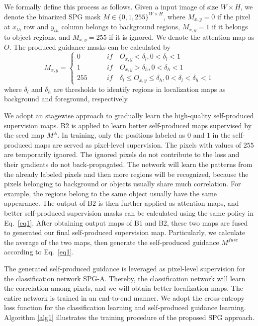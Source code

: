 \documentclass[runningheads]{llncs}
\begin{document}
We formally define this process as follows. Given a input image of size $W \times H$, we denote the binarized SPG mask $M\in\{0,1,255\}^{W\times H}$,
where $M_{x,y} = 0$ if the pixel at $x_{th}$ row and $y_{th}$ column belongs to background regions, $M_{x,y} = 1$ if it belongs to object regions, and $M_{x,y} = 255$ if it is ignored.
We denote the attention map as $O$.
The produced guidance masks can be calculated by
\begin{equation}\label{eq1}
M_{x,y} = \left\{
\begin{aligned}
 0 \qquad   &if \quad O_{x,y} < \delta_l, 0<\delta_l<1 \\
 1 \qquad   &if \quad O_{x,y} > \delta_h, 0<\delta_h<1 \\
 255 \qquad &if \quad \delta_l \leq  O_{x,y}  \leq \delta_h, 0<\delta_l<\delta_h<1
\end{aligned}
\right.
\end{equation}
where $\delta_l$ and $\delta_h$ are thresholds to identify regions in localization maps as background and foreground, respectively.

We adopt an stagewise approach to gradually learn the high-quality self-produced supervision maps.
B2 is applied to learn better self-produced maps supervised by the seed map $M^{A}$.
In training, only the positions labeled as $0$ and $1$ in the self-produced maps are served as pixel-level supervision.
The pixels with values of $255$ are temporarily ignored. The ignored pixels do not contribute to the loss and their gradients do not back-propagated.
The network will learn the patterns from the already labeled pixels and then more regions will be recognized,
because the pixels belonging to background or objects usually share much correlation.
For example, the regions belong to the same object usually have the same appearance.
The output of B2 is then further applied as attention maps, and better self-produced supervision masks can be calculated using the same policy in Eq.~\eqref{eq1}.
After obtaining output maps of B1 and B2, these two maps are fused to generated our final self-produced supervision map. Particularly, we calculate the average of the two maps, then generate the self-produced guidance $M^{fuse}$ according to Eq.~\eqref{eq1}.

The generated self-produced guidance is leveraged as pixel-level supervision for the classification network SPG-A.
Thereby, the classification network will learn the correlation among pixels, and we will obtain better localization maps.
The entire network is trained in an end-to-end manner.
We adopt the cross-entropy loss function for the classification learning and self-produced guidance learning.
Algorithm \ref{alg1} illustrates the training procedure of the proposed SPG approach.
\end{document}
